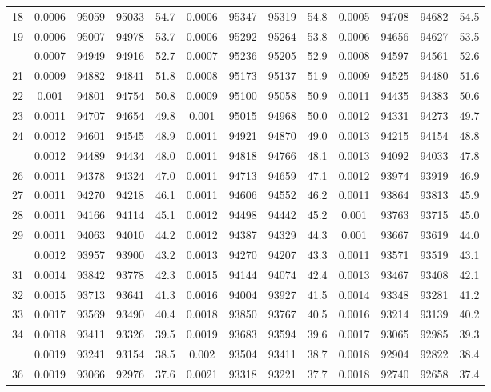 \documentclass[
  14pt,
]{article}
\begin{document}
\begin{longtable}[t]{lcccccccccccc}
18 & 0.0006 & 95059 & 95033 & 54.7 & 0.0006 & 95347 & 95319 & 54.8 & 0.0005 & 94708 & 94682 & 54.5\\
19 & 0.0006 & 95007 & 94978 & 53.7 & 0.0006 & 95292 & 95264 & 53.8 & 0.0006 & 94656 & 94627 & 53.5\\
\addlinespace
20 & 0.0007 & 94949 & 94916 & 52.7 & 0.0007 & 95236 & 95205 & 52.9 & 0.0008 & 94597 & 94561 & 52.6\\
21 & 0.0009 & 94882 & 94841 & 51.8 & 0.0008 & 95173 & 95137 & 51.9 & 0.0009 & 94525 & 94480 & 51.6\\
22 & 0.001 & 94801 & 94754 & 50.8 & 0.0009 & 95100 & 95058 & 50.9 & 0.0011 & 94435 & 94383 & 50.6\\
23 & 0.0011 & 94707 & 94654 & 49.8 & 0.001 & 95015 & 94968 & 50.0 & 0.0012 & 94331 & 94273 & 49.7\\
24 & 0.0012 & 94601 & 94545 & 48.9 & 0.0011 & 94921 & 94870 & 49.0 & 0.0013 & 94215 & 94154 & 48.8\\
\addlinespace
25 & 0.0012 & 94489 & 94434 & 48.0 & 0.0011 & 94818 & 94766 & 48.1 & 0.0013 & 94092 & 94033 & 47.8\\
26 & 0.0011 & 94378 & 94324 & 47.0 & 0.0011 & 94713 & 94659 & 47.1 & 0.0012 & 93974 & 93919 & 46.9\\
27 & 0.0011 & 94270 & 94218 & 46.1 & 0.0011 & 94606 & 94552 & 46.2 & 0.0011 & 93864 & 93813 & 45.9\\
28 & 0.0011 & 94166 & 94114 & 45.1 & 0.0012 & 94498 & 94442 & 45.2 & 0.001 & 93763 & 93715 & 45.0\\
29 & 0.0011 & 94063 & 94010 & 44.2 & 0.0012 & 94387 & 94329 & 44.3 & 0.001 & 93667 & 93619 & 44.0\\
\addlinespace
30 & 0.0012 & 93957 & 93900 & 43.2 & 0.0013 & 94270 & 94207 & 43.3 & 0.0011 & 93571 & 93519 & 43.1\\
31 & 0.0014 & 93842 & 93778 & 42.3 & 0.0015 & 94144 & 94074 & 42.4 & 0.0013 & 93467 & 93408 & 42.1\\
32 & 0.0015 & 93713 & 93641 & 41.3 & 0.0016 & 94004 & 93927 & 41.5 & 0.0014 & 93348 & 93281 & 41.2\\
33 & 0.0017 & 93569 & 93490 & 40.4 & 0.0018 & 93850 & 93767 & 40.5 & 0.0016 & 93214 & 93139 & 40.2\\
34 & 0.0018 & 93411 & 93326 & 39.5 & 0.0019 & 93683 & 93594 & 39.6 & 0.0017 & 93065 & 92985 & 39.3\\
\addlinespace
35 & 0.0019 & 93241 & 93154 & 38.5 & 0.002 & 93504 & 93411 & 38.7 & 0.0018 & 92904 & 92822 & 38.4\\
36 & 0.0019 & 93066 & 92976 & 37.6 & 0.0021 & 93318 & 93221 & 37.7 & 0.0018 & 92740 & 92658 & 37.4\\

\end{longtable}
\end{document}
